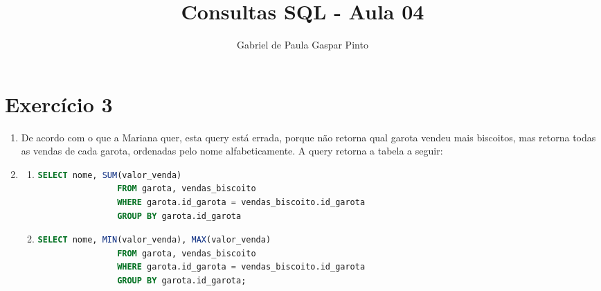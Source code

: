 \documentclass{article}
\title{Consultas SQL - Aula 04}
\author{Gabriel de Paula Gaspar Pinto}
\date{}
\begin{document}
\maketitle

\section*{Exercício 3}

\begin{enumerate}[label=\alph*.]
    \item De acordo com o que a Mariana quer, esta query está errada, porque não retorna qual garota vendeu mais biscoitos, mas retorna todas as vendas de cada garota, ordenadas pelo nome alfabeticamente. A query retorna a tabela a seguir:
    
    \begin{center}
    \end{center}

    \item 
    \begin{enumerate}[label=\roman*., labelsep=0.5em, leftmargin=*]
        
        \item 
        \begin{adjustwidth}{1em}{0pt}
            \begin{lstlisting}[language=SQL]
                SELECT nome, SUM(valor_venda)
                FROM garota, vendas_biscoito
                WHERE garota.id_garota = vendas_biscoito.id_garota
                GROUP BY garota.id_garota
            \end{lstlisting}
        \end{adjustwidth}

        \item
        \begin{adjustwidth}{1em}{0pt}
            \begin{lstlisting}[language=SQL]
                SELECT nome, MIN(valor_venda), MAX(valor_venda)
                FROM garota, vendas_biscoito
                WHERE garota.id_garota = vendas_biscoito.id_garota
                GROUP BY garota.id_garota;
            \end{lstlisting}
        \end{adjustwidth}


\end{enumerate}
\end{enumerate}
\end{document}

